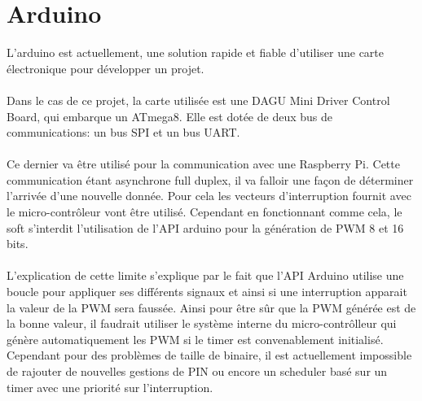\section{Arduino}



  L'arduino est actuellement, une solution rapide et fiable d'utiliser une carte
électronique pour développer un projet.
\paragraph{}
  Dans le cas de ce projet, la carte utilisée est une DAGU Mini Driver Control
Board, qui embarque un ATmega8. Elle est dotée de deux bus de communications: un
bus SPI et un bus UART.
\paragraph{}
  Ce dernier va être utilisé pour la communication avec une Raspberry Pi. Cette
communication étant asynchrone full duplex, il va falloir une façon de
déterminer l'arrivée d'une nouvelle donnée. Pour cela les
vecteurs d'interruption fournit avec le micro-contrôleur vont être utilisé.
Cependant en fonctionnant comme cela, le soft s'interdit l'utilisation de l'API
arduino pour la génération de PWM 8 et 16 bits.
\paragraph{}
  L'explication de cette limite s'explique par le fait que l'API Arduino utilise
une boucle pour appliquer ses différents signaux et ainsi si une interruption
apparait la valeur de la PWM sera faussée. Ainsi pour être sûr que la PWM
générée est de la bonne valeur, il faudrait utiliser le système interne du
micro-contrôlleur qui génère automatiquement les PWM si le timer est
convenablement initialisé. Cependant pour des problèmes de taille de binaire,
il est actuellement impossible de rajouter de nouvelles gestions de PIN ou
encore un scheduler basé sur un timer avec une priorité sur l'interruption.
